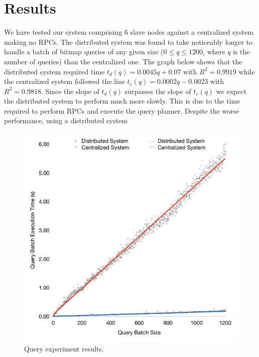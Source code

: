 \section{Results}
We have tested our system comprising 6 slave nodes against a centralized
system making no RPCs. The distributed system was found to take noticeably
longer to handle a batch of bitmap queries of any given size (\(0\leq q\leq 1200\), where \(q\) is the number of queries) than the centralized one. The graph below shows that the distributed
system required time \(t_d(q)=0.0045q+0.07\) with \(R^2=0.9919\) while the centralized system followed the line
\(t_c(q)=0.0002q-0.0023\) with \(R^2=0.9818\). Since the slope of \(t_d(q)\) surpasses the slope of
\(t_c(q)\) we expect the distributed system to perform much more slowly. This is due to
the time required to perform RPCs and execute the query planner. Despite the worse performance,
using a distributed system
\begin{figure}
\centering
\includegraphics[width=\columnwidth]{query-experiment-results}
\caption{Query experiment results.}
\end{figure}
